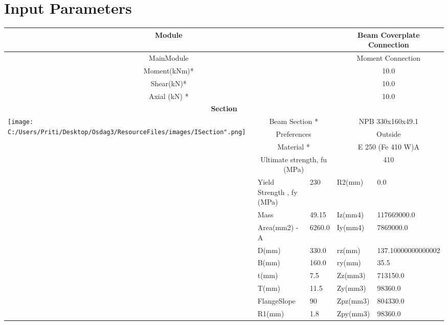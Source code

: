\documentclass{article}%
\begin{document}
%
\normalsize%
\pagestyle{header}%
\section{Input Parameters}%
\label{sec:InputParameters}%
\renewcommand{\arraystretch}{1.2}%
\begin{longtable}{|p{5cm}|p{2cm}|p{2cm}|p{2cm}|p{5cm}|}%
\hline%
\hline%
\multicolumn{3}{|c|}{Module}&\multicolumn{2}{|c|}{Beam Coverplate Connection}\\%
\hline%
\hline%
\multicolumn{3}{|c|}{MainModule}&\multicolumn{2}{|c|}{Moment Connection}\\%
\hline%
\hline%
\multicolumn{3}{|c|}{Moment(kNm)*}&\multicolumn{2}{|c|}{10.0}\\%
\hline%
\hline%
\multicolumn{3}{|c|}{Shear(kN)*}&\multicolumn{2}{|c|}{10.0}\\%
\hline%
\hline%
\multicolumn{3}{|c|}{Axial (kN) *}&\multicolumn{2}{|c|}{10.0}\\%
\hline%
\hline%
\multicolumn{5}{|c|}{\textbf{Section}}\\%
\hline%
\hline%
\multirow{13}{*}{\texttt{[image: C:/Users/Priti/Desktop/Osdag3/ResourceFiles/images/ISection".png]}}&\multicolumn{2}{|c|}{Beam Section *}&\multicolumn{2}{|c|}{NPB 330x160x49.1}\\%
\cline{2%
-%
5}%
&\multicolumn{2}{|c|}{Preferences}&\multicolumn{2}{|c|}{Outside}\\%
\cline{2%
-%
5}%
&\multicolumn{2}{|c|}{Material *}&\multicolumn{2}{|c|}{E 250 (Fe 410 W)A}\\%
\cline{2%
-%
5}%
&\multicolumn{2}{|c|}{Ultimate strength, fu (MPa)}&\multicolumn{2}{|c|}{410}\\%
\cline{2%
-%
5}%
&Yield Strength , fy (MPa)&230&R2(mm)&0.0\\%
\cline{2%
-%
5}%
&Mass&49.15&Iz(mm4)&117669000.0\\%
\cline{2%
-%
5}%
&Area(mm2) {-} A&6260.0&Iy(mm4)&7869000.0\\%
\cline{2%
-%
5}%
&D(mm)&330.0&rz(mm)&137.10000000000002\\%
\cline{2%
-%
5}%
&B(mm)&160.0&ry(mm)&35.5\\%
\cline{2%
-%
5}%
&t(mm)&7.5&Zz(mm3)&713150.0\\%
\cline{2%
-%
5}%
&T(mm)&11.5&Zy(mm3)&98360.0\\%
\cline{2%
-%
5}%
&FlangeSlope&90&Zpz(mm3)&804330.0\\%
\cline{2%
-%
5}%
&R1(mm)&1.8&Zpy(mm3)&98360.0\\%

\end{longtable}
\end{document}
